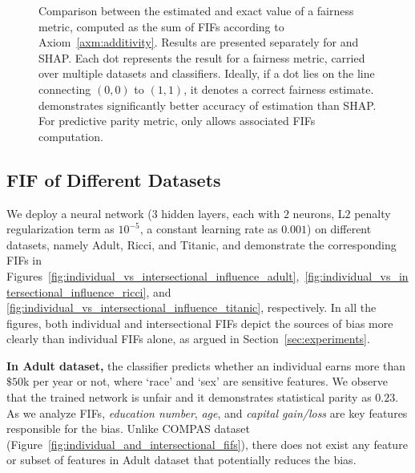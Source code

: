 \begin{figure}[t!]\vspace*{-1em}
	\centering
	\caption{Comparison between the estimated and exact value of a fairness metric, computed as the sum of FIFs according to Axiom~\ref{axm:additivity}. Results are presented separately for {\framework} and SHAP. Each dot represents the result for a fairness metric, carried over multiple datasets and classifiers. Ideally, if a dot lies on the line connecting $ (0,0) $ to $ (1,1) $, it denotes a correct fairness estimate. {\framework} demonstrates significantly better accuracy of estimation than SHAP. For predictive parity metric, only {\framework} allows associated FIFs computation.}
	\label{fig:accuracy_scatter_plot}
\end{figure}



\subsection{FIF of Different Datasets}
We deploy a neural network ($ 3 $ hidden layers, each with $ 2 $ neurons, L$ 2 $ penalty regularization term as $ 10^{-5} $, a constant learning rate as $ 0.001 $) on different datasets, namely Adult, Ricci, and Titanic, and demonstrate the corresponding FIFs in Figures~\ref{fig:individual_vs_intersectional_influence_adult},~\ref{fig:individual_vs_intersectional_influence_ricci}, and \ref{fig:individual_vs_intersectional_influence_titanic}, respectively. In all the figures, both individual and intersectional FIFs depict the sources of bias more clearly than individual FIFs alone, as argued in Section~\ref{sec:experiments}. 


\textbf{In Adult dataset,} the classifier predicts whether an individual earns more than $ \$50 $k per year or not, where `race' and `sex' are sensitive features. We observe that the trained network is unfair and it demonstrates statistical parity as $ 0.23 $. As we analyze FIFs,  \textit{education number}, \textit{age}, and \textit{capital gain/loss} are key features responsible for the bias. Unlike COMPAS dataset (Figure~\ref{fig:individual_and_intersectional_fifs}), there does not exist any feature or subset of features in Adult dataset that potentially reduces the bias.

